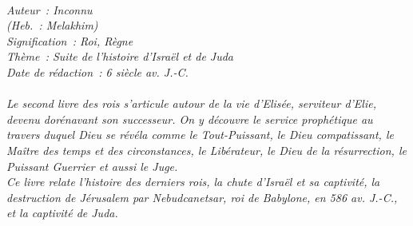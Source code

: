 \BFont
\noindent\hrulefill
{\footnotesize
\textit{
\bigskip
{\centering{}
\\Auteur~: Inconnu
\\(Heb.~: Melakhim)
\\Signification~: Roi, Règne
\\Thème~: Suite de l'histoire d'Israël et de Juda
\\Date de rédaction~: 6 siècle av. J.-C.\\}
}
\textit{
\\Le second livre des rois s'articule autour de la vie d'Elisée, serviteur d'Elie, devenu dorénavant son successeur. On y découvre le service prophétique au travers duquel Dieu se révéla comme le Tout-Puissant, le Dieu compatissant, le Maître des temps et des circonstances, le Libérateur, le Dieu de la résurrection, le Puissant Guerrier et aussi le Juge.
\\Ce livre relate l'histoire des derniers rois, la chute d'Israël et sa captivité, la destruction de Jérusalem par Nebudcanetsar, roi de Babylone, en 586 av. J.-C., et la captivité de Juda.\bigskip
}
}
\par\nobreak\noindent\hrulefill
